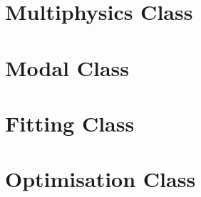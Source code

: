 \section{Multiphysics Class}


\section{Modal Class}
\clearpage

\section{Fitting Class}
\clearpage
%

\section{Optimisation Class}
\clearpage
